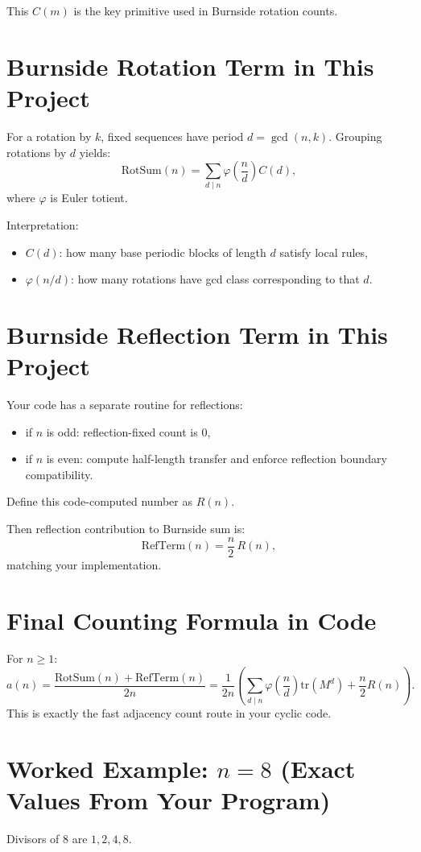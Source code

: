\documentclass[12pt]{article}
\theoremstyle{definition}
\begin{document}
This \(C(m)\) is the key primitive used in Burnside rotation counts.

\section{Burnside Rotation Term in This Project}
For a rotation by \(k\), fixed sequences have period \(d=\gcd(n,k)\). Grouping rotations by \(d\) yields:
\[
\text{RotSum}(n)=\sum_{d\mid n} \varphi\!\left(\frac{n}{d}\right) C(d),
\]
where \(\varphi\) is Euler totient.

Interpretation:
\begin{itemize}
    \item \(C(d)\): how many base periodic blocks of length \(d\) satisfy local rules,
    \item \(\varphi(n/d)\): how many rotations have gcd class corresponding to that \(d\).
\end{itemize}

\section{Burnside Reflection Term in This Project}
Your code has a separate routine for reflections:
\begin{itemize}
    \item if \(n\) is odd: reflection-fixed count is 0,
    \item if \(n\) is even: compute half-length transfer and enforce reflection boundary compatibility.
\end{itemize}
Define this code-computed number as \(R(n)\).

Then reflection contribution to Burnside sum is:
\[
\text{RefTerm}(n)=\frac{n}{2}\,R(n),
\]
matching your implementation.

\section{Final Counting Formula in Code}
For \(n\ge1\):
\[
a(n)=\frac{\text{RotSum}(n)+\text{RefTerm}(n)}{2n}
=\frac{1}{2n}\left(\sum_{d\mid n}\varphi\!\left(\frac{n}{d}\right)\mathrm{tr}(M^d)+\frac{n}{2}R(n)\right).
\]
This is exactly the fast adjacency count route in your cyclic code.

\section{Worked Example: \(n=8\) (Exact Values From Your Program)}
Divisors of 8 are \(1,2,4,8\).
\end{document}
